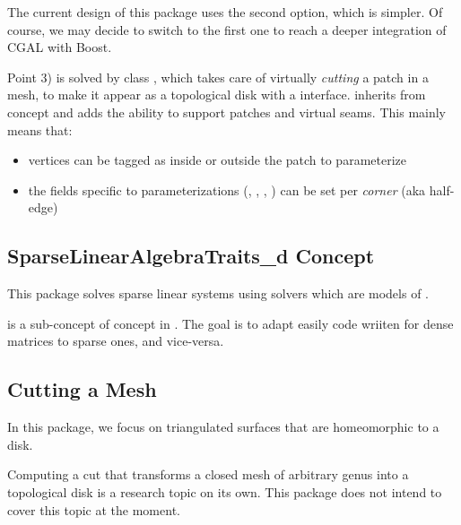 The current design of this package uses the second option, which is simpler.
Of course, we may decide to switch to the first one to reach a deeper integration
of CGAL with Boost.

Point 3) is solved by class ,
which takes care of virtually {\em cutting}
a patch in a  mesh, to make it appear as a topological disk
with a  interface.
 inherits from concept  and adds
the ability to support patches and virtual seams.
This mainly means that:
\begin{itemize}
\item vertices can be tagged as inside or outside the patch to parameterize
\item the fields specific to parameterizations (, , , )
      can be set per {\em corner} (aka half-edge)
\end{itemize}


\subsection{SparseLinearAlgebraTraits\_d Concept}

This package solves sparse linear systems using solvers which are models
of .

 is a sub-concept of  concept
in .
The goal is to adapt easily code wriiten for dense matrices to sparse ones,
and vice-versa.


\subsection{Cutting a Mesh}

In this package, we focus on triangulated surfaces that are homeomorphic to a
disk.

Computing a cut that transforms a closed mesh of arbitrary genus into
a topological disk is a research topic on its own. This package does
not intend to cover this topic at the moment.



